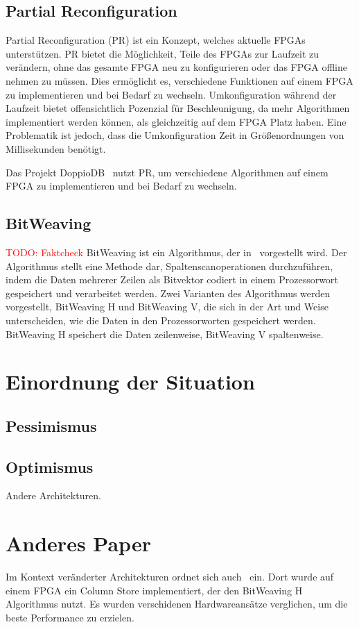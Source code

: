 \documentclass[conference]{IEEEtran}
\newcommand{\todo}[1]{\textcolor{red}{TODO: #1}}
\begin{document}
\subsection{Partial Reconfiguration}
Partial Reconfiguration (PR) ist ein Konzept, welches aktuelle FPGAs unterstützen. PR bietet die Möglichkeit, Teile des FPGAs zur Laufzeit zu verändern,
ohne das gesamte FPGA neu zu konfigurieren oder das FPGA offline nehmen zu müssen. Dies ermöglicht es, verschiedene Funktionen auf einem FPGA zu implementieren
und bei Bedarf zu wechseln. Umkonfiguration während der Laufzeit bietet offensichtlich Pozenzial für Beschleunigung, da mehr Algorithmen implementiert
werden können, als gleichzeitig auf dem FPGA Platz haben. Eine Problematik ist jedoch, dass die Umkonfiguration Zeit in Größenordnungen von Millisekunden benötigt.

Das Projekt DoppioDB~\cite{li_bitweaving_2013} nutzt PR, um verschiedene Algorithmen auf einem FPGA zu implementieren und bei Bedarf zu wechseln.

\subsection{BitWeaving}
\todo{Faktcheck}
BitWeaving ist ein Algorithmus, der in~\cite{li_bitweaving_2013} vorgestellt wird. Der Algorithmus stellt eine Methode dar, Spaltenscanoperationen durchzuführen, indem
die Daten mehrerer Zeilen als Bitvektor codiert in einem Prozessorwort gespeichert und verarbeitet werden. Zwei Varianten des Algorithmus werden vorgestellt, BitWeaving H und BitWeaving V,
die sich in der Art und Weise unterscheiden, wie die Daten in den Prozessorworten gespeichert werden. BitWeaving H speichert die Daten zeilenweise, BitWeaving V spaltenweise.


\section{Einordnung der Situation}
\subsection{Pessimismus}

\subsection{Optimismus}
Andere Architekturen.

\section{Anderes Paper} %
Im Kontext veränderter Architekturen ordnet sich auch~\cite{lisa_column_2018} ein. Dort wurde auf einem FPGA ein Column Store implementiert, der
den BitWeaving H Algorithmus nutzt. Es wurden verschidenen Hardwareansätze verglichen, um die beste Performance zu erzielen.
\end{document}

